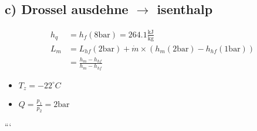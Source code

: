 \subsection*{c) Drossel ausdehne $\rightarrow$ isenthalp}

\begin{align*}
    h_q &= h_f \left( 8 \text{bar} \right) = 264.1 \frac{\text{kJ}}{\text{kg}} \\
    L_m &= L_{hf} \left( 2 \text{bar} \right) + \dot{m} \times \left( h_{m} \left( 2 \text{bar} \right) - h_{hf} \left( 1 \text{bar} \right) \right) \\
    &= \frac{h_{m} - h_{hf}}{h_{m} - h_{hf}}
\end{align*}

\begin{itemize}
    \item $T_z = -22^\circ C$
    \item $Q = \frac{p_1}{p_2} = 2 \text{bar}$
\end{itemize}

```
